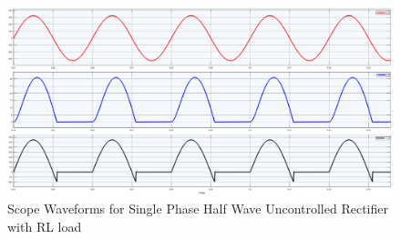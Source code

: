 \begin{figure}[h]
    \centering
    \includegraphics[width=1\textwidth]{images/experiment-1/circuit-scope-simulation-02.png}
    \caption{Scope Waveforms for Single Phase Half Wave Uncontrolled Rectifier with RL load}
    \label{Fig_waveform_single-phase-half-wave-uncontrolled-rectifier-with-RL-load}
\end{figure}

\pagebreak
